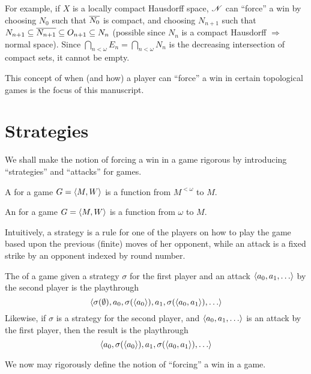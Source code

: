 For example, if $X$ is a locally compact Hausdorff space, $\mathscr{N}$ can ``force'' 
a win by choosing $N_0$ such that $\overline{N_0}$ is compact, and choosing 
$N_{n+1}$ such that 
$N_{n+1}\subseteq\overline{N_{n+1}}\subseteq O_{n+1}\subseteq N_n$ 
(possible since $N_n$ is a compact Hausdorff $\Rightarrow$ normal space). 
Since $\bigcap_{n<\omega} E_n = \bigcap_{n<\omega} N_n$ is the decreasing 
intersection of compact sets, it cannot be empty.

This concept of when (and how) a player can ``force'' a win in certain
topological games is the focus of this manuscript.



\section{Strategies}

We shall make the notion of forcing a win in a game rigorous by introducing
``strategies'' and ``attacks'' for games.

\begin{defn}
  A  for a game $G=\langle M,W\rangle$ is a function 
  from $M^{<\omega}$ to $M$.
\end{defn}

\begin{defn}
  An  for a game $G=\langle M,W\rangle$ is a function 
  from $\omega$ to $M$.
\end{defn}

Intuitively, a strategy is a rule for one of the players on how to play
the game based upon the previous (finite) moves of her opponent, while an 
attack is a fixed strike by an opponent indexed by round number. 


\begin{defn}
  The  of a game given a strategy $\sigma$ for the first player 
  and an attack $\<a_0,a_1,\dots\>$ by the second player is the playthrough
    \[
      \<
        \sigma(\emptyset), 
        a_0,
        \sigma(\<a_0\>), 
        a_1, 
        \sigma(\<a_0,a_1\>),
        \dots
      \>
    \]
  Likewise, if $\sigma$ is a strategy for the second player, and 
  $\<a_0,a_1,\dots\>$ is an attack by the first player, then the result is
  the playthrough
    \[
      \< 
        a_0,
        \sigma(\<a_0\>), 
        a_1, 
        \sigma(\<a_0,a_1\>),
        \dots
      \>
    \]
\end{defn}

We now may rigorously define the notion of ``forcing'' a win in a game.

